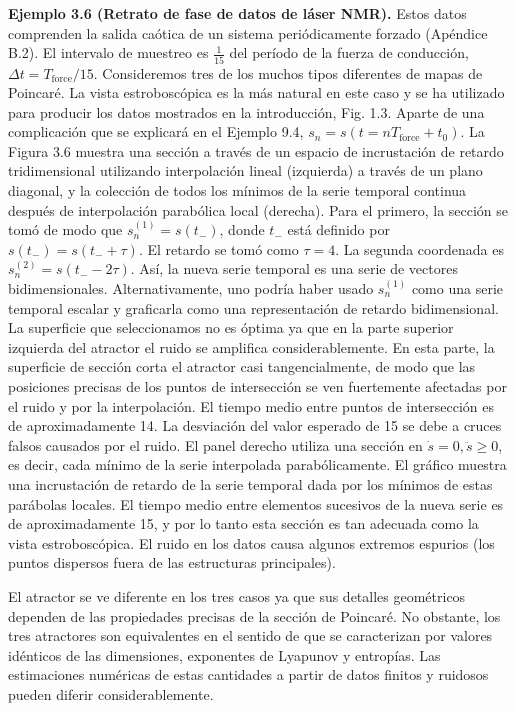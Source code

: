 \documentclass[10pt,a4paper]{book}
\begin{document}
\textbf{Ejemplo 3.6 (Retrato de fase de datos de láser NMR).} Estos datos comprenden la salida caótica de un sistema periódicamente forzado (Apéndice B.2). El intervalo de muestreo es $\frac{1}{15}$ del período de la fuerza de conducción, $\Delta t = T_{\text{force}}/15$. Consideremos tres de los muchos tipos diferentes de mapas de Poincaré. La vista estroboscópica es la más natural en este caso y se ha utilizado para producir los datos mostrados en la introducción, Fig. 1.3. Aparte de una complicación que se explicará en el Ejemplo 9.4, $s_n = s(t = nT_{\text{force}} + t_0)$. La Figura 3.6 muestra una sección a través de un espacio de incrustación de retardo tridimensional utilizando interpolación lineal (izquierda) a través de un plano diagonal, y la colección de todos los mínimos de la serie temporal continua después de interpolación parabólica local (derecha). Para el primero, la sección se tomó de modo que $s_n^{(1)} = s(t_-) $, donde $t_-$ está definido por $s(t_-) = s(t_- + \tau)$. El retardo se tomó como $\tau = 4$. La segunda coordenada es $s_n^{(2)} = s(t_- - 2\tau)$. Así, la nueva serie temporal es una serie de vectores bidimensionales. Alternativamente, uno podría haber usado $s_n^{(1)}$ como una serie temporal escalar y graficarla como una representación de retardo bidimensional. La superficie que seleccionamos no es óptima ya que en la parte superior izquierda del atractor el ruido se amplifica considerablemente. En esta parte, la superficie de sección corta el atractor casi tangencialmente, de modo que las posiciones precisas de los puntos de intersección se ven fuertemente afectadas por el ruido y por la interpolación. El tiempo medio entre puntos de intersección es de aproximadamente 14. La desviación del valor esperado de 15 se debe a cruces falsos causados por el ruido. El panel derecho utiliza una sección en $\dot{s} = 0, \ddot{s} \geq 0$, es decir, cada mínimo de la serie interpolada parabólicamente. El gráfico muestra una incrustación de retardo de la serie temporal dada por los mínimos de estas parábolas locales. El tiempo medio entre elementos sucesivos de la nueva serie es de aproximadamente 15, y por lo tanto esta sección es tan adecuada como la vista estroboscópica. El ruido en los datos causa algunos extremos espurios (los puntos dispersos fuera de las estructuras principales). 

El atractor se ve diferente en los tres casos ya que sus detalles geométricos dependen de las propiedades precisas de la sección de Poincaré. No obstante, los tres atractores son equivalentes en el sentido de que se caracterizan por valores idénticos de las dimensiones, exponentes de Lyapunov y entropías. Las estimaciones numéricas de estas cantidades a partir de datos finitos y ruidosos pueden diferir considerablemente.
\end{document}
